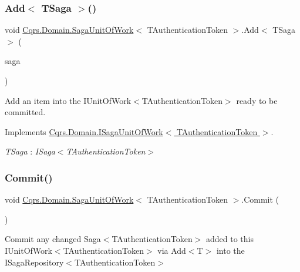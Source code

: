 \subsubsection{\texorpdfstring{Add$<$ T\+Saga $>$()}{Add< TSaga >()}}
{\footnotesize\ttfamily void \hyperlink{classCqrs_1_1Domain_1_1SagaUnitOfWork}{Cqrs.\+Domain.\+Saga\+Unit\+Of\+Work}$<$ T\+Authentication\+Token $>$.Add$<$ T\+Saga $>$ (\begin{DoxyParamCaption}\item[{T\+Saga}]{saga }\end{DoxyParamCaption})}



Add an item into the I\+Unit\+Of\+Work$<$\+T\+Authentication\+Token$>$ ready to be committed. 



Implements \hyperlink{interfaceCqrs_1_1Domain_1_1ISagaUnitOfWork_a5e7c8e18a8d71fc915db48fac00e7da4_a5e7c8e18a8d71fc915db48fac00e7da4}{Cqrs.\+Domain.\+I\+Saga\+Unit\+Of\+Work$<$ T\+Authentication\+Token $>$}.

\begin{Desc}
\item[Type Constraints]\begin{description}
\item[{\em T\+Saga} : {\em I\+Saga$<$T\+Authentication\+Token$>$}]\end{description}
\end{Desc}
\mbox{\label{classCqrs_1_1Domain_1_1SagaUnitOfWork_aed2756dadfe0a0903a791944d02c4db8_aed2756dadfe0a0903a791944d02c4db8}} 
\subsubsection{\texorpdfstring{Commit()}{Commit()}}
{\footnotesize\ttfamily void \hyperlink{classCqrs_1_1Domain_1_1SagaUnitOfWork}{Cqrs.\+Domain.\+Saga\+Unit\+Of\+Work}$<$ T\+Authentication\+Token $>$.Commit (\begin{DoxyParamCaption}{ }\end{DoxyParamCaption})}



Commit any changed Saga$<$\+T\+Authentication\+Token$>$ added to this I\+Unit\+Of\+Work$<$\+T\+Authentication\+Token$>$ via Add$<$\+T$>$ into the I\+Saga\+Repository$<$\+T\+Authentication\+Token$>$ 



